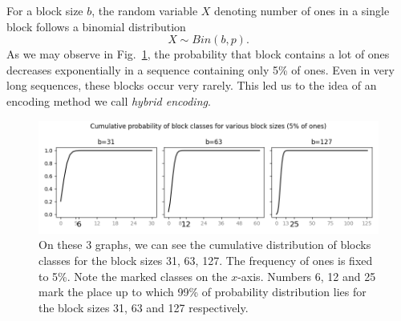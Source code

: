 For a block size $b$, the random variable $X$ denoting number of ones in a single
block follows a binomial distribution $$X \sim Bin(b, p).$$ As we may observe in
Fig.~\ref{obr:hybridEncodingDistribution}, the probability that block contains
a lot of ones decreases exponentially in a sequence containing only 5\% of ones.
Even in very long sequences, these blocks occur very rarely. This led us to the
idea of an encoding method we call \textit{hybrid encoding}.

\begin{figure}
	\centerline{
		\includegraphics[width=\textwidth]{images/hybrid_encoding_motivation}
	}
	\caption[TODO]{On these 3 graphs, we can see the cumulative distribution
    of blocks classes for the block sizes 31, 63, 127. The frequency of ones is
    fixed to 5\%. Note the marked classes on the $x$-axis. Numbers 6, 12 and
    25 mark the place up to which 99\% of probability distribution lies for
    the block sizes 31, 63 and 127 respectively.
	}
	\label{obr:hybridEncodingDistribution}
\end{figure}

